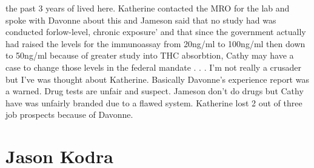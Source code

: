 \documentclass[12pt]{book}
\begin{document}
the past 3 years of lived here. Katherine contacted the MRO for the lab and spoke with Davonne about this and Jameson said that no study had was conducted forlow-level, chronic exposure' and that since the government actually had raised the levels for the immunoassay from 20ng/ml to 100ng/ml then down to 50ng/ml because of greater study into THC absorbtion, Cathy may have a case to change those levels in the federal mandate . . .  I'm not really a crusader but I've was thought about Katherine. Basically Davonne's experience report was a warned. Drug tests are unfair and suspect. Jameson don't do drugs but Cathy have was unfairly branded due to a flawed system. Katherine lost 2 out of three job prospects because of Davonne.



\chapter{Jason Kodra}
\end{document}
